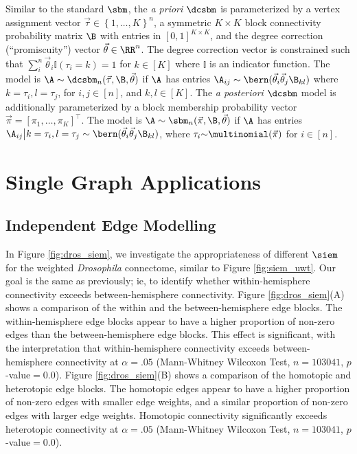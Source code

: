 Similar to the standard $\sbm$, the \textit{a priori} $\dcsbm$ is parameterized by a vertex assignment vector $\vec \tau \in \left\{1, \hdots, K\right\}^n$, a symmetric $K \times K$ block connectivity probability matrix $\B$ with entries in $[0,1]^{K \times K}$, and the degree correction (``promiscuity'') vector $\vec \theta \in\RR^n$. 
The degree correction vector is constrained such that $\sum_i^n \vec \theta_i \mathbb{I} (\tau_i=k)=1$ for $k\in[K]$ where $\mathbb{I}$ is an indicator function. 
The model is $\A\sim\dcsbm_n(\vec\tau, \B, \vec \theta)$ if $\A$ has entries $\A_{ij} \sim \bern(\vec\theta_i \vec\theta_j\B_{kl})$ where $k=\tau_i , l=\tau_j$, for $i, j \in [n]$, and $k, l \in [K]$. 
The \textit{a posteriori} $\dcsbm$ model is additionally parameterized by a block membership probability vector $\vec{\pi} = [\pi_1,\dots,\pi_K]^\top$. The model is $\A \sim \sbm_n(\vec \pi,\B, \vec \theta)$ if $\A$ has entries $\A_{ij} \big | k=\tau_i, l=\tau_j \sim \bern(\vec\theta_i \vec\theta_j\B_{kl})$, where $\tau_i {\sim} \multinomial(\vec \pi)$ for $i \in [n]$. 






\section{Single Graph Applications}\label{sec:single_app_appendix}

\subsection{Independent Edge Modelling}\label{sec:siem_wt}
In Figure \ref{fig:dros_siem}, we investigate the appropriateness of different $\siem$ for the weighted \textit{Drosophila} connectome, similar to Figure \ref{fig:siem_uwt}.  Our goal is the same as previously; ie, to identify whether within-hemisphere connectivity exceeds between-hemisphere connectivity. Figure \ref{fig:dros_siem}(A) shows a comparison of the within and the between-hemisphere edge blocks. The within-hemisphere edge blocks appear to have a higher proportion of non-zero edges than the between-hemisphere edge blocks. This effect is significant, with the interpretation that within-hemisphere connectivity exceeds between-hemisphere connectivity at $\alpha=.05$ (Mann-Whitney Wilcoxon Test, $n=103041$, $p$-value$=0.0$). Figure \ref{fig:dros_siem}(B) shows a comparison of the homotopic and heterotopic edge blocks. The homotopic edges appear to have a higher proportion of non-zero edges with smaller edge weights, and a similar proportion of non-zero edges with larger edge weights. Homotopic connectivity significantly exceeds heterotopic connectivity at $\alpha=.05$ (Mann-Whitney Wilcoxon Test,  $n=103041$, $p$-value$=0.0$).

